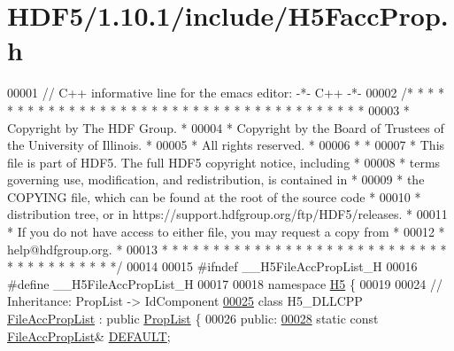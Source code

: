 \hypertarget{_h_d_f5_21_810_81_2include_2_h5_facc_prop_8h_source}{}\section{H\+D\+F5/1.10.1/include/\+H5\+Facc\+Prop.h}
\label{_h_d_f5_21_810_81_2include_2_h5_facc_prop_8h_source}

\begin{DoxyCode}
00001 \textcolor{comment}{// C++ informative line for the emacs editor: -*- C++ -*-}
00002 \textcolor{comment}{/* * * * * * * * * * * * * * * * * * * * * * * * * * * * * * * * * * * * * * *}
00003 \textcolor{comment}{ * Copyright by The HDF Group.                                               *}
00004 \textcolor{comment}{ * Copyright by the Board of Trustees of the University of Illinois.         *}
00005 \textcolor{comment}{ * All rights reserved.                                                      *}
00006 \textcolor{comment}{ *                                                                           *}
00007 \textcolor{comment}{ * This file is part of HDF5.  The full HDF5 copyright notice, including     *}
00008 \textcolor{comment}{ * terms governing use, modification, and redistribution, is contained in    *}
00009 \textcolor{comment}{ * the COPYING file, which can be found at the root of the source code       *}
00010 \textcolor{comment}{ * distribution tree, or in https://support.hdfgroup.org/ftp/HDF5/releases.  *}
00011 \textcolor{comment}{ * If you do not have access to either file, you may request a copy from     *}
00012 \textcolor{comment}{ * help@hdfgroup.org.                                                        *}
00013 \textcolor{comment}{ * * * * * * * * * * * * * * * * * * * * * * * * * * * * * * * * * * * * * * */}
00014 
00015 \textcolor{preprocessor}{#ifndef \_\_H5FileAccPropList\_H}
00016 \textcolor{preprocessor}{#define \_\_H5FileAccPropList\_H}
00017 
00018 \textcolor{keyword}{namespace }\hyperlink{namespace_h5}{H5} \{
00019 
00024 \textcolor{comment}{//  Inheritance: PropList -> IdComponent}
\hyperlink{class_h5_1_1_file_acc_prop_list}{00025} \textcolor{keyword}{class }H5\_DLLCPP \hyperlink{class_h5_1_1_file_acc_prop_list}{FileAccPropList} : \textcolor{keyword}{public} \hyperlink{class_h5_1_1_prop_list}{PropList} \{
00026    \textcolor{keyword}{public}:
\hyperlink{class_h5_1_1_file_acc_prop_list_a866e7c16e8840c67a194f3bef8501e48}{00028}         \textcolor{keyword}{static} \textcolor{keyword}{const} \hyperlink{class_h5_1_1_file_acc_prop_list}{FileAccPropList}& \hyperlink{class_h5_1_1_file_acc_prop_list_a866e7c16e8840c67a194f3bef8501e48}{DEFAULT};

\end{DoxyCode}
